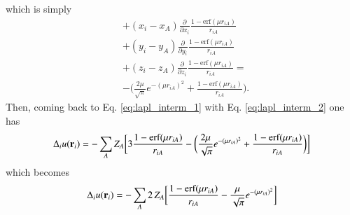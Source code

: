 \documentclass[aip,jcp,reprint,noshowkeys,superscriptaddress]{revtex4-1}
\newcommand{\deriv}[3]{\frac{\partial^{#3} #1}{\partial {#2}^{#3}}}
\newcommand{\br}[0]{{\bf {r}}}
\begin{document}
which is simply 
\begin{equation}
 \begin{aligned}
 \label{eq:lapl_interm_2}
 & + (x_i - x_A) \deriv{}{x_i}{}\frac{1 - \text{erf}(\mu r_{iA})}{r_{iA}} \\ 
 & + (y_i - y_A) \deriv{}{y_i}{}\frac{1 - \text{erf}(\mu r_{iA})}{r_{iA}} \\ 
 & + (z_i - z_A) \deriv{}{z_i}{}\frac{1 - \text{erf}(\mu r_{iA})}{r_{iA}}  = \\
 &- \bigg( \frac{2 \mu}{\sqrt{\pi}} e^{-(\mu r_{iA})^2} + \frac{1 - \text{erf}(\mu r_{iA})}{r_{iA}}\bigg).
 \end{aligned}
\end{equation}
Then, coming back to Eq. \eqref{eq:lapl_interm_1} with Eq. \eqref{eq:lapl_interm_2} one has 
\begin{equation}
 \Delta_i u(\br{}_i) = - \sum_{A}  Z_A \bigg[ 3 \frac{1 - \text{erf}(\mu r_{iA})}{r_{iA}}  - \bigg( \frac{2 \mu}{\sqrt{\pi}} e^{-(\mu r_{iA})^2} + \frac{1 - \text{erf}(\mu r_{iA})}{r_{iA}}\bigg) \bigg]
\end{equation}
which becomes 
\begin{equation}
 \Delta_i u(\br{}_i) = - \sum_{A}  2 \, Z_A  \bigg[ \frac{1 - \text{erf}(\mu r_{iA})}{r_{iA}}  - \frac{\mu}{\sqrt{\pi}} e^{-(\mu r_{iA})^2}  \bigg]
\end{equation}
\end{document}
